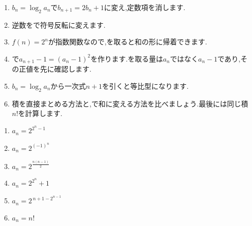   \noindent{}\par\nobreak
  \begin{enumerate}[label=(\arabic*),parsep=3pt,format=\bookitemlink{example-logarithmic-1}{hint}{problem}]
    \item $b_n=\log_2a_n$で$b_{n+1}=2b_n+1$に変え,定数項を消します.
    \item 逆数をで符号反転に変えます.
    \item $f(n)=2^n$が指数関数なので,を取ると和の形に帰着できます.
    \item {}で$a_{n+1}-1=(a_n-1)^2$を作ります.を取る量は$a_n$ではなく$a_n-1$であり,その正値を先に確認します.
    \item $b_n=\log_2a_n$から一次式$n+1$を引くと等比型になります.
    \item 積を直接まとめる方法と,で和に変える方法を比べましょう.最後には同じ積$n!$を計算します.
  \end{enumerate}
  
  \noindent{}\par\nobreak
  \begin{enumerate}[label=(\arabic*),parsep=3pt,format=\bookitemlink{example-logarithmic-1}{answer}{problem}]
    \item $\displaystyle a_n=2^{2^{n}-1}$
    \item $a_n=2^{(-1)^{n}}$
    \item $a_n=2^{\frac{n(n-1)}{2}}$
    \item $a_n=2^{2^n}+1$
    \item $\displaystyle a_n=2^{\,n+1-2^{n-1}}$
    \item $a_n=n!$
  \end{enumerate}
  
  \noindent{}\par\nobreak
  
